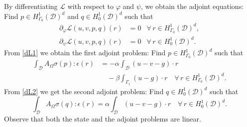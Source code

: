 \documentclass[iicol,pdflatex,sn-mathphys-ay]{sn-jnl}%
\theoremstyle{thmstyleone}%
\theoremstyle{thmstyletwo}%
\theoremstyle{thmstylethree}%
\begin{document}
By differentiating $\mathcal{L}$ with respect to $\varphi$ and $\psi$,
we obtain the adjoint equations:
Find $p \in  H^1_{\Gamma_0}(\mathcal{D})^d$ and $ q\in H^1_0(\mathcal{D})^d$ such that
\begin{align}
\label{dL1}	\partial_{\varphi}\mathcal{L}(u,v,p,q)(r)&=0 & \forall \, r \in  H^1_{\Gamma_0}(\mathcal{D})^d,\\
\label{dL2}	\partial_{\psi}\mathcal{L}(u,v,p,q)(r)&=0 & \forall \, r \in  H^1_0(\mathcal{D})^d.
\end{align}
From \eqref{dL1} we obtain the first adjoint problem:
Find $p \in  H^1_{\Gamma_0}(\mathcal{D})^d$ such that
\begin{align*} \label{eq:f-adj}
\int_{\mathcal{D}} A_{\Omega}\sigma(p):\epsilon(r) & = -\alpha \int_{\mathcal{D}} (u-v-g) \cdot r \\
&\quad -\beta \int_{\Gamma_1} (u - g) \cdot r \quad
\forall \, r \in  H^1_{\Gamma_0}(\mathcal{D})^d.
\end{align*}
From \eqref{dL2} we get the second adjoint problem:
Find $q \in  H^1_{0}(\mathcal{D})^d$ such that
\begin{equation*} \label{eq:g-adj}
	\int_{\mathcal{D}} A_{\Omega}\sigma(q):\epsilon(r) =
	\alpha \int_{\mathcal{D}} (u-v-g) \cdot r \quad \forall \, r \in  H^1_0(\mathcal{D})^d.
\end{equation*}
Observe that both the state and the adjoint problems are linear.
\end{document}
